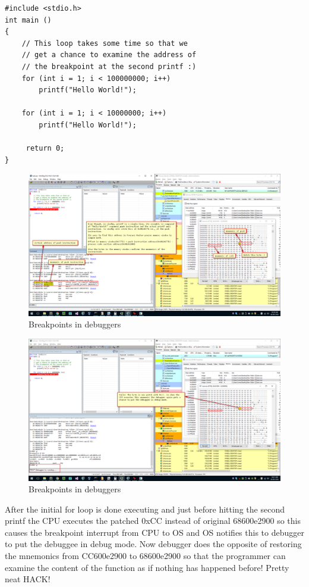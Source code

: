 \documentclass{article}
\begin{document}
\begin{verbatim}
#include <stdio.h>
int main ()
{
    // This loop takes some time so that we
    // get a chance to examine the address of
    // the breakpoint at the second printf :)
    for (int i = 1; i < 100000000; i++)
        printf("Hello World!");

    for (int i = 1; i < 10000000; i++)
        printf("Hello World!");

     return 0;
}
\end{verbatim}
\begin{figure}[H]
\centering
\includegraphics[width=\textwidth]{3.Breakpoints-in-Debuggers.png}
\caption{Breakpoints in debuggers}
\end{figure}
\begin{figure}[H]
\centering
\includegraphics[width=\textwidth]{4.Breakpoints-in-Debuggers.png}
\caption{Breakpoints in debuggers}
\end{figure}
After the initial for loop is done executing  and just before hitting the second printf the CPU executes the patched 0xCC instead of original 68600e2900 so this causes the breakpoint interrupt from CPU to OS and OS notifies this to debugger to put the debuggee in debug mode. Now debugger does the opposite of restoring the mnemonics from CC600e2900 to 68600e2900 so that the programmer can examine the content of the function as if nothing has happened before! Pretty neat HACK!
\end{document}
